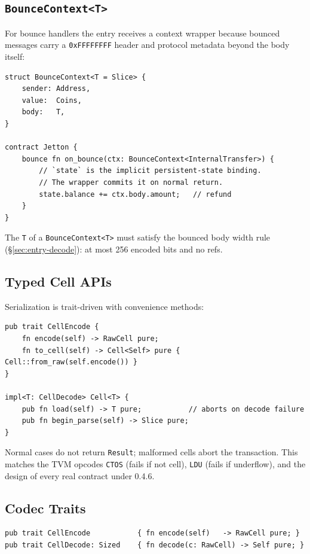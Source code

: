 \documentclass[12pt,oneside]{article}
\begin{document}
\subsection{\texttt{BounceContext<T>}}
For bounce handlers the entry receives a context wrapper because
bounced messages carry a \verb|0xFFFFFFFF| header and protocol
metadata beyond the body itself:

\begin{verbatim}
struct BounceContext<T = Slice> {
    sender: Address,
    value:  Coins,
    body:   T,
}

contract Jetton {
    bounce fn on_bounce(ctx: BounceContext<InternalTransfer>) {
        // `state` is the implicit persistent-state binding.
        // The wrapper commits it on normal return.
        state.balance += ctx.body.amount;   // refund
    }
}
\end{verbatim}

The \verb|T| of a \verb|BounceContext<T>| must satisfy the bounced
body width rule (\S\ref{sec:entry-decode}): at most 256 encoded bits
and no refs.

\subsection{Typed Cell APIs}
Serialization is trait-driven with convenience methods:

\begin{verbatim}
pub trait CellEncode {
    fn encode(self) -> RawCell pure;
    fn to_cell(self) -> Cell<Self> pure { Cell::from_raw(self.encode()) }
}

impl<T: CellDecode> Cell<T> {
    pub fn load(self) -> T pure;           // aborts on decode failure
    pub fn begin_parse(self) -> Slice pure;
}
\end{verbatim}

Normal cases do not return \verb|Result|; malformed cells abort the
transaction. This matches the TVM opcodes \verb|CTOS| (fails if not
cell), \verb|LDU| (fails if underflow), and the design of every real
contract under 0.4.6.

\subsection{Codec Traits}
\begin{verbatim}
pub trait CellEncode           { fn encode(self)   -> RawCell pure; }
pub trait CellDecode: Sized    { fn decode(c: RawCell) -> Self pure; }
\end{verbatim}
\end{document}
